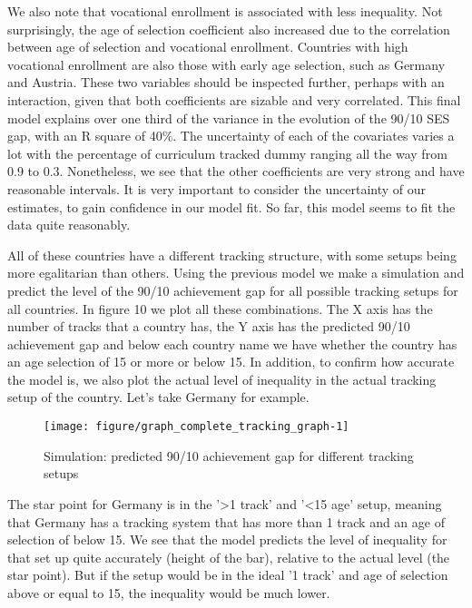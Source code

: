 \documentclass[11pt, a4paper]{article}\usepackage[]{graphicx}\usepackage[]{color}
\begin{document}
We also note that vocational enrollment is associated with less inequality. Not surprisingly, the age of selection coefficient also increased due to the correlation between age of selection and vocational enrollment. Countries with high vocational enrollment are also those with early age selection, such as Germany and Austria. These two variables should be inspected further, perhaps with an interaction, given that both coefficients are sizable and very correlated. This final model explains over one third of the variance in the evolution of the 90/10 SES gap, with an R square of 40\%. The uncertainty of each of the covariates varies a lot with the percentage of curriculum tracked dummy ranging all the way from 0.9 to 0.3. Nonetheless, we see that the other coefficients are very strong and have reasonable intervals. It is very important to consider the uncertainty of our estimates, to gain confidence in our model fit. So far, this model seems to fit the data quite reasonably.

All of these countries have a different tracking structure, with some setups being more egalitarian than others. Using the previous model we make a simulation and predict the level of the 90/10 achievement gap for all possible tracking setups for all countries. In figure 10 we plot all these combinations. The X axis has the number of tracks that a country has, the Y axis has the predicted 90/10 achievement gap and below each country name we have whether the country has an age selection of 15 or more or below 15. In addition, to confirm how accurate the model is, we also plot the actual level of inequality in the actual tracking setup of the country. Let's take Germany for example.



\begin{figure}

{\centering \texttt{[image: figure/graph\_complete\_tracking\_graph-1]} 

}

\caption[Simulation]{Simulation: predicted 90/10 achievement gap for different tracking setups}\label{fig:graph_complete_tracking_graph}
\end{figure}



The star point for Germany is in the '\textgreater 1 track' and '\textless 15 age' setup, meaning that Germany has a tracking system that has more than 1 track and an age of selection of below 15. We see that the model predicts the level of inequality for that set up quite accurately (height of the bar), relative to the actual level (the star point). But if the setup would be in the ideal '1 track' and age of selection above or equal to 15, the inequality would be much lower. 
\end{document}
